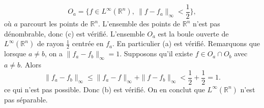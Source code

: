 {\begin{enumerate}
{$$
O_a = \{ f\in L^{\infty}(\mathbb{R}^n), ~ \|f - f_a \|_{\infty} <
\frac{1}{2}\},
$$
o\`u $a$ parcourt les points de $\mathbb{R}^n$. L'ensemble des
points de $\mathbb{R}^n$ n'est pas d\'enombrable, donc (c) est
v\'erifi\'e.  L'ensemble $O_a$ est la boule ouverte de
$L^{\infty}(\mathbb{R}^n)$ de rayon $\frac{1}{2}$ centr\'ee en
$f_{a}$. En particulier (a) est v\'erifi\'e. Remarquons que
lorsque $a\neq b$, on a $\|f_{a} - f_{b}\|_{\infty} = 1$.
Supposons qu'il existe $f \in O_{a}\cap O_b$ avec $a\neq b$. Alors
$$
\|f_{a} - f_{b}\|_{\infty} \leq \|f_a - f\|_{\infty} + \|f -
f_{b}\|_{\infty} < \frac{1}{2} + \frac{1}{2} = 1.
$$
ce qui n'est pas possible. Donc (b) est v\'erifi\'e. On en conclut
que $L^{\infty}(\mathbb{R}^n)$ n'est pas s\'eparable.}
\end{enumerate}
}
